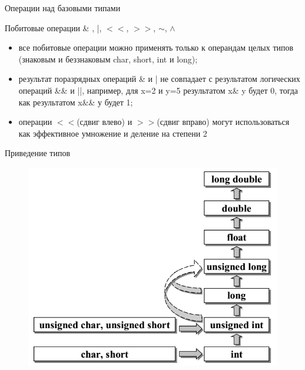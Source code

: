 \documentclass{beamer}
\begin{document}
\begin{frame}{Операции над базовыми типами}
\begin{block}{Побитовые операции \& , |, $<<$, $>>$, $\sim$, $\wedge$}
\begin{itemize}
\item все побитовые операции можно применять только к операндам целых типов (знаковым и беззнаковым char, short, int и
long);
\item результат поразрядных операций \& и | не совпадает с результатом логических операций \&\& и ||, например, для x=2 и y=5 результатом x\& y будет 0, тогда как результатом x\&\& у будет 1;
\item операции $<<$(сдвиг влево) и $>>$(сдвиг вправо) могут использоваться как эффективное умножение и деление на степени 2
\end{itemize}
\end{block}
\end{frame}

\begin{frame}{Приведение типов}
\begin{figure}[h]
\centering
\includegraphics[scale=0.5]{images/lec02-pic04.png}
\end{figure}
\end{frame}
\end{document}

